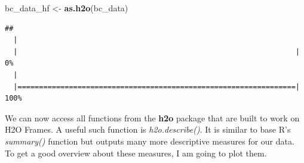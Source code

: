 \documentclass[]{article}
\newenvironment{Shaded}{\begin{snugshade}}{\end{snugshade}}
\newcommand{\KeywordTok}[1]{\textcolor[rgb]{0.13,0.29,0.53}{\textbf{{#1}}}}
\newcommand{\DataTypeTok}[1]{\textcolor[rgb]{0.13,0.29,0.53}{{#1}}}
\newcommand{\DecValTok}[1]{\textcolor[rgb]{0.00,0.00,0.81}{{#1}}}
\newcommand{\FloatTok}[1]{\textcolor[rgb]{0.00,0.00,0.81}{{#1}}}
\newcommand{\StringTok}[1]{\textcolor[rgb]{0.31,0.60,0.02}{{#1}}}
\newcommand{\NormalTok}[1]{{#1}}
\begin{document}
\begin{Shaded}
\begin{Highlighting}[]
\NormalTok{bc_data_hf <-}\StringTok{ }\KeywordTok{as.h2o}\NormalTok{(bc_data)}
\end{Highlighting}
\end{Shaded}

\begin{verbatim}
## 
  |                                                                       
  |                                                                 |   0%
  |                                                                       
  |=================================================================| 100%
\end{verbatim}

We can now access all functions from the \textbf{h2o} package that are
built to work on H2O Frames. A useful such function is
\emph{h2o.describe()}. It is similar to base R's \emph{summary()}
function but outputs many more descriptive measures for our data. To get
a good overview about these measures, I am going to plot them.

\begin{Shaded}
\end{Shaded}
\end{document}
